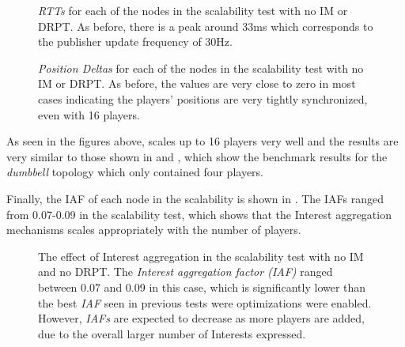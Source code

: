 \begin{figure}[H]
    \centering
    \caption{\textit{RTTs} for each of the nodes in the scalability test with no IM or DRPT. As before, there is a peak around 33ms which corresponds to the publisher update frequency of 30Hz.}
    \label{fig:eval:no-im-no-dr:agg-packet-times}
\end{figure}

\begin{figure}[H]
    \centering
    \caption{\textit{Position Deltas} for each of the nodes in the scalability test with no IM or DRPT. As before, the values are very close to zero in most cases indicating the players' positions are very tightly synchronized, even with 16 players.}
    \label{fig:eval:no-im-no-dr:agg-pos-deltas}
\end{figure}

As seen in the figures above, \game{} scales up to 16 players very well and the results are very similar to those shown in  and , which show the benchmark results for the \textit{dumbbell} topology which only contained four players. 

Finally, the IAF of each node in the scalability is shown in . The IAFs ranged from 0.07-0.09 in the scalability test, which shows that the Interest aggregation mechanisms scales appropriately with the number of players. 

\begin{figure}[H]
    \centering
    \caption{The effect of Interest aggregation in the scalability test with no IM and no DRPT. The \textit{Interest aggregation factor (IAF)} ranged between 0.07 and 0.09 in this case, which is significantly lower than the best \textit{IAF} seen in previous tests were optimizations were enabled. However, \textit{IAFs} are expected to decrease as more players are added, due to the overall larger number of Interests expressed.}
    \label{fig:eval:no-im-no-dr:int-agg}
\end{figure}




